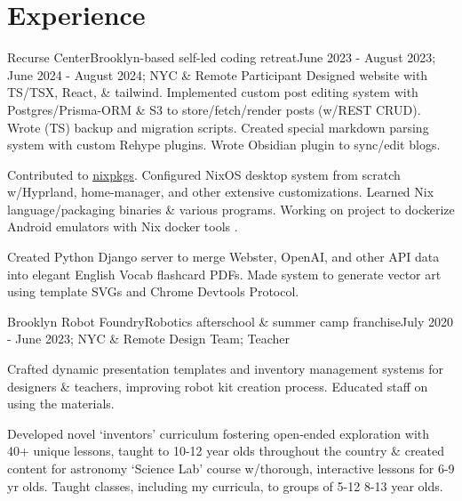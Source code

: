 \documentclass[letterpaper, 10pt]{article}
\begin{document}
\resumeSubHeadingListEnd

\section{Experience}
\resumeSubHeadingListStart

\resumeSubheading
{Recurse Center}{Brooklyn-based self-led coding retreat}{June 2023 - August 2023; June 2024 - August 2024; NYC \& Remote}
{Participant}{}{}
\resumeItemListStart
{}
{Designed website with TS/TSX, React, \& tailwind. Implemented custom post editing system with Postgres/Prisma-ORM \& S3 to store/fetch/render posts (w/REST CRUD). Wrote (TS) backup and migration scripts. Created special markdown parsing system with custom Rehype plugins. Wrote Obsidian plugin to sync/edit blogs.}

{Contributed to \href{https://github.com/NixOS/nixpkgs}{nixpkgs}. Configured NixOS desktop system from scratch w/Hyprland, home-manager, and other extensive customizations. Learned Nix language/packaging binaries \& various programs. Working on project to dockerize Android emulators with Nix docker tools .}

{Created Python Django server to merge Webster, OpenAI, and other API data into elegant English Vocab flashcard PDFs. Made system to generate vector art using template SVGs and Chrome Devtools Protocol.}
\resumeItemListEnd

\resumeSubheading
{Brooklyn Robot Foundry}{Robotics afterschool \& summer camp franchise}{July 2020 - June 2023; NYC \& Remote}
{Design Team; Teacher}{}{}

\resumeItemListStart
{}
{Crafted dynamic presentation templates and inventory management systems for designers \& teachers, improving robot kit creation process. Educated staff on using the materials.}

{Developed novel `inventors' curriculum fostering open-ended exploration with 40+ unique lessons, taught to 10-12 year olds throughout the country \& created content for astronomy `Science Lab' course w/thorough, interactive lessons for 6-9 yr olds. Taught classes, including my curricula, to groups of 5-12 8-13 year olds.}
\resumeItemListEnd
\end{document}
